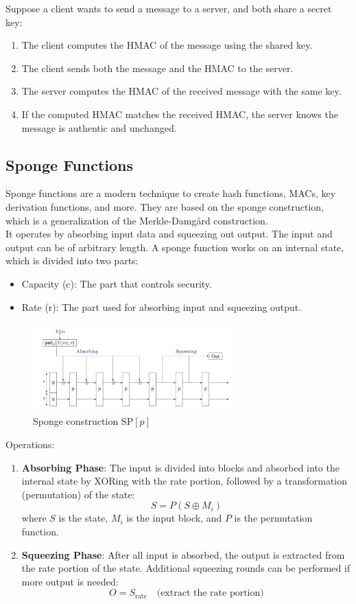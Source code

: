 Suppose a client wants to send a message to a server, and both share a secret key:
\begin{enumerate}
  \item The client computes the HMAC of the message using the shared key.
  \item The client sends both the message and the HMAC to the server.
  \item The server computes the HMAC of the received message with the same key.
  \item If the computed HMAC matches the received HMAC, the server knows the message is authentic and unchanged.
\end{enumerate}

\subsection{Sponge Functions}
Sponge functions are a modern technique to create hash functions, MACs, key derivation functions, and more. They are based on the sponge construction, which is a generalization of the Merkle-Damg\aa rd construction. \\

It operates by absorbing input data and squeezing out output. The input and output can be of arbitrary length.
A sponge function works on an internal state, which is divided into two parts:
\begin{itemize}
  \item Capacity (c): The part that controls security.
  \item Rate (r): The part used for absorbing input and squeezing output.
\end{itemize}

\begin{figure}[h!]
    \centering
    \includegraphics[width=0.7\textwidth]{img/sponge.png}
    \caption{Sponge construction $\text{SP}[p]$}
\end{figure}

Operations:
\begin{enumerate}
    \item \textbf{Absorbing Phase}: The input is divided into blocks and absorbed into the internal state by XORing with the rate portion, followed by a transformation (permutation) of the state:
    \[
    S = P(S \oplus M_i)
    \]
    where \( S \) is the state, \( M_i \) is the input block, and \( P \) is the permutation function.
    
    \item  \textbf{Squeezing Phase}: After all input is absorbed, the output is extracted from the rate portion of the state. Additional squeezing rounds can be performed if more output is needed:
    \[
    O = S_{\text{rate}} \quad \text{(extract the rate portion)}
    \]
\end{enumerate}

